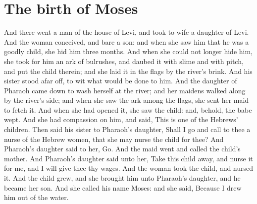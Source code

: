 \section*{The birth of Moses}
\begin{biblechapter} %
\verse And there went a man of the house of Levi, and took to wife a daughter of Levi.
\verse And the woman conceived, and bare a son: and when she saw him that he was a goodly child, she hid him three months.
\verse And when she could not longer hide him, she took for him an ark of bulrushes, and daubed it with slime and with pitch, and put the child therein; and she laid it in the flags by the river's brink.
\verse And his sister stood afar off, to wit what would be done to him.
\verse And the daughter of Pharaoh came down to wash herself at the river; and her maidens walked along by the river's side; and when she saw the ark among the flags, she sent her maid to fetch it.
\verse And when she had opened it, she saw the child: and, behold, the babe wept. And she had compassion on him, and said, This is one of the Hebrews' children.
\verse Then said his sister to Pharaoh's daughter, Shall I go and call to thee a nurse of the Hebrew women, that she may nurse the child for thee?
\verse And Pharaoh's daughter said to her, Go. And the maid went and called the child's mother.
\verse And Pharaoh's daughter said unto her, Take this child away, and nurse it for me, and I will give thee thy wages. And the woman took the child, and nursed it.
\verse And the child grew, and she brought him unto Pharaoh's daughter, and he became her son. And she called his name Moses: and she said, Because I drew him out of the water.

\end{biblechapter}
